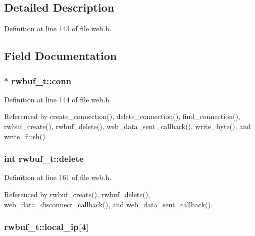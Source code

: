 \subsection{Detailed Description}


Definition at line 143 of file web.\+h.



\subsection{Field Documentation}
\subsubsection[{\texorpdfstring{conn}{conn}}]{$\ast$ rwbuf\+\_\+t\+::conn}\hypertarget{structrwbuf__t_a15785240e32c27f7af7c4b0cb1a6e39b}{}\label{structrwbuf__t_a15785240e32c27f7af7c4b0cb1a6e39b}


Definition at line 144 of file web.\+h.



Referenced by create\+\_\+connection(), delete\+\_\+connection(), find\+\_\+connection(), rwbuf\+\_\+create(), rwbuf\+\_\+delete(), web\+\_\+data\+\_\+sent\+\_\+callback(), write\+\_\+byte(), and write\+\_\+flush().

\subsubsection[{\texorpdfstring{delete}{delete}}]{\setlength{\rightskip}{0pt plus 5cm}int rwbuf\+\_\+t\+::delete}\hypertarget{structrwbuf__t_a54e278f96a331cf0a61d22094c4b9f87}{}\label{structrwbuf__t_a54e278f96a331cf0a61d22094c4b9f87}


Definition at line 161 of file web.\+h.



Referenced by rwbuf\+\_\+create(), rwbuf\+\_\+delete(), web\+\_\+data\+\_\+disconnect\+\_\+callback(), and web\+\_\+data\+\_\+sent\+\_\+callback().

\subsubsection[{\texorpdfstring{local\+\_\+ip}{local_ip}}]{ rwbuf\+\_\+t\+::local\+\_\+ip\mbox{[}4\mbox{]}}\hypertarget{structrwbuf__t_aa26b4813db79aeaa293bb1eadfde0b54}{}\label{structrwbuf__t_aa26b4813db79aeaa293bb1eadfde0b54}


